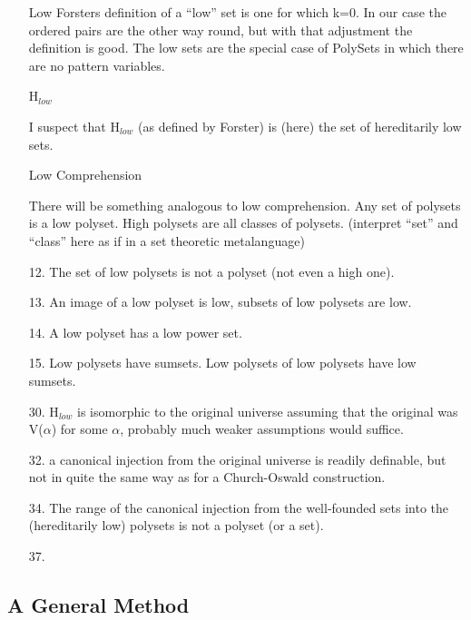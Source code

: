 \documentclass{article}
\begin{document}
\begin{article}
\begin{itemize}
\begin{itemize}
\item[Low] Forsters definition of a ``low'' set is one for which k=0.
In our case the ordered pairs are the other way round, but with that adjustment the definition is good.
The low sets are the special case of PolySets in which there are no pattern variables.

\item[H$_{low}$]\ 

I suspect that H$_{low}$ (as defined by Forster\cite{forster2005}) is (here) the set of hereditarily low sets.

\item[Low Comprehension]\ 

There will be something analogous to low comprehension.
Any set of polysets is a low polyset.
High polysets are all classes of polysets.
(interpret ``set'' and ``class'' here as if in a set theoretic metalanguage)

\item[12.] The set of low polysets is not a polyset (not even a high one).

\item[13.] An image of a low polyset is low, subsets of low polysets are low.

\item[14.] A low polyset has a low power set.

\item[15.] Low polysets have sumsets. Low polysets of low polysets have low sumsets.

\item[30.] H$_{low}$ is isomorphic to the original universe assuming that the original was V($\alpha$) for some $\alpha$, probably much weaker assumptions would suffice.

\item[32.] a canonical injection from the original universe is readily definable, but not in quite the same way as for a Church-Oswald construction.

\item[34.] The range of the canonical injection from the well-founded sets into the (hereditarily low) polysets is not a polyset (or a set).

\item[37.] 

\end{itemize}
\end{itemize}

\subsection{A General Method}


\end{article}
\end{document}

